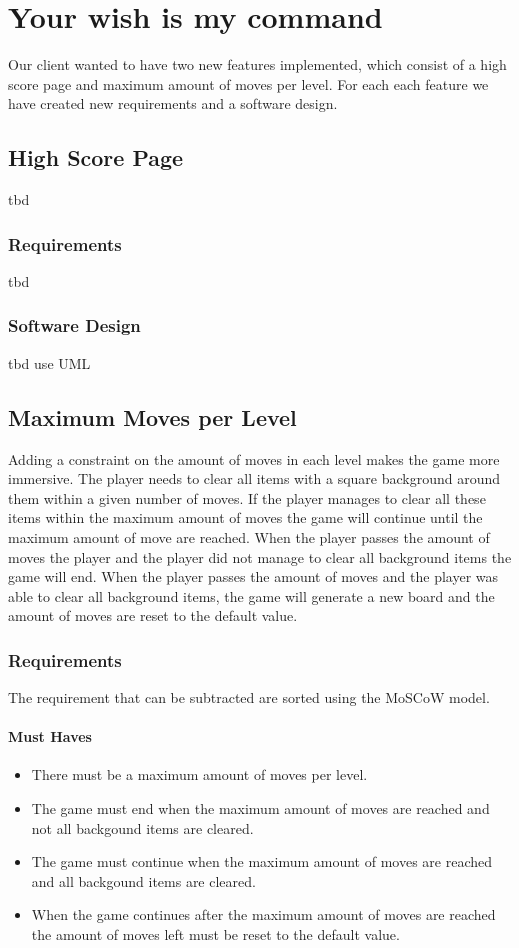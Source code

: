 \documentclass{article}
\begin{document}
\newpage
\section{Your wish is my command}
Our client wanted to have two new features implemented, which consist of a high score page and maximum amount of moves per level. For each each feature we have created new requirements and a software design.

\subsection{High Score Page}
tbd

\subsubsection{Requirements}
tbd

\subsubsection{Software Design}
tbd {use UML}

\subsection{Maximum Moves per Level}
Adding a constraint on the amount of moves in each level makes the game more immersive. The player needs to clear all items with a square background around them within a given number of moves. If the player manages to clear all these items within the maximum amount of moves the game will continue until the maximum amount of move are reached. When the player passes the amount of moves the player and the player did not manage to clear all background items the game will end. When the player passes the amount of moves and the player was able to clear all background items, the game will generate a new board and the amount of moves are reset to the default value. 

\subsubsection{Requirements}
The requirement that can be subtracted are sorted using the MoSCoW model.

\paragraph{Must Haves}
\begin{itemize}
	\item There must be a maximum amount of moves per level.
	\item The game must end when the maximum amount of moves are reached and not all backgound items are cleared.
	\item The game must continue when the maximum amount of moves are reached and all backgound items are cleared.
	\item When the game continues after the maximum amount of moves are reached the amount of moves left must be reset to the default value.
\end{itemize}
\end{document}
